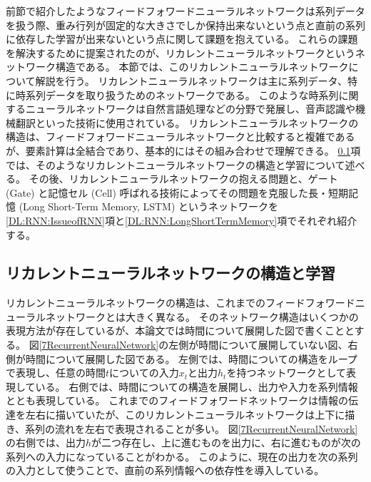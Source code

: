 前節で紹介したようなフィードフォワードニューラルネットワークは系列データを扱う際、重み行列が固定的な大きさでしか保持出来ないという点と直前の系列に依存した学習が出来ないという点に関して課題を抱えている。
これらの課題を解決するために提案されたのが、リカレントニューラルネットワークというネットワーク構造である。
本節では、このリカレントニューラルネットワークについて解説を行う。
リカレントニューラルネットワークは主に系列データ、特に時系列データを取り扱うためのネットワークである。
このような時系列に関するニューラルネットワークは自然言語処理などの分野で発展し、音声認識や機械翻訳といった技術に使用されている。
リカレントニューラルネットワークの構造は、フィードフォワードニューラルネットワークと比較すると複雑であるが、要素計算は全結合であり、基本的にはその組み合わせで理解できる。
\ref{DL:RNN:ReccurentNeuralNetwork}項では、そのようなリカレントニューラルネットワークの構造と学習について述べる。
その後、リカレントニューラルネットワークの抱える問題と、ゲート (Gate) と記憶セル (Cell) 呼ばれる技術によってその問題を克服した長・短期記憶 (Long Short-Term Memory, LSTM\cite{LSTMpaper}) というネットワークを\ref{DL:RNN:IssueofRNN}項と\ref{DL:RNN:LongShortTermMemory}項でそれぞれ紹介する。


\subsection{リカレントニューラルネットワークの構造と学習} \label{DL:RNN:ReccurentNeuralNetwork}

リカレントニューラルネットワークの構造は、これまでのフィードフォワードニューラルネットワークとは大きく異なる。
そのネットワーク構造はいくつかの表現方法が存在しているが、本論文では時間について展開した図で書くこととする。
図\ref{7RecurrentNeuralNetwork}の左側が時間について展開していない図、右側が時間について展開した図である。
左側では、時間についての構造をループで表現し、任意の時間$t$についての入力$x_t$と出力$h_t$を持つネットワークとして表現している。
右側では、時間についての構造を展開し、出力や入力を系列情報ととも表現している。
これまでのフィードフォワードネットワークは情報の伝達を左右に描いていたが、このリカレントニューラルネットワークは上下に描き、系列の流れを左右で表現されることが多い。
図\ref{7RecurrentNeuralNetwork}の右側では、出力$h$が二つ存在し、上に進むものを出力に、右に進むものが次の系列への入力になっていることがわかる。
このように、現在の出力を次の系列の入力として使うことで、直前の系列情報への依存性を導入している。

